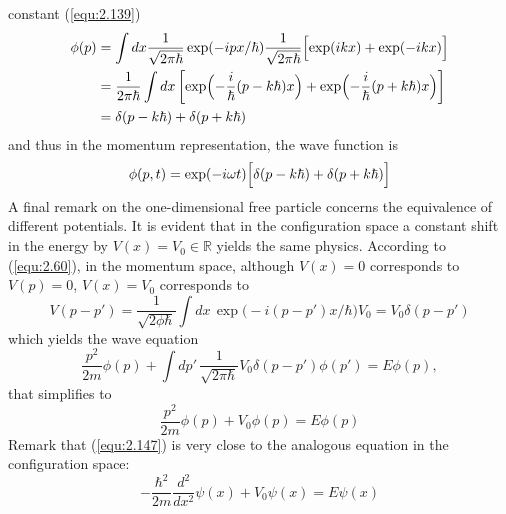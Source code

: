 constant (\ref{equ:2.139})
  \begin{alignat}{2}
    \phi(p) &= \int dx \frac{1}{\sqrt{2\pi\hbar}}
    \exp(-ipx/\hbar) \frac{1}{\sqrt{2\pi\hbar}}
    \Bigl[\exp(ikx) + \exp(-ikx)\Bigr] \\
    &=
    \frac{1}{2\pi\hbar} \int dx \,
    \biggl[
      \exp\Bigl(-\frac{i}{\hbar}(p-k\hbar)x\Bigr)+
      \exp\Bigl(-\frac{i}{\hbar}(p+k\hbar)x\Bigr)
    \biggr]\\
    &=
    \delta(p - k\hbar) + \delta(p + k\hbar)
  \end{alignat}
and thus in the momentum representation, the wave function
is
\begin{equation}
  \phi(p,t) = \exp(-i\omega t) \Bigl[\delta(p - k\hbar) +
  \delta(p+k\hbar)\Bigr]
  \label{equ:2.145}
\end{equation}
A final remark on the one-dimensional free particle concerns
the equivalence of different potentials. It is evident that
in the configuration space a constant shift in the energy by
$V(x) = V_0 \in \mathbb{R}$ yields the same physics.
According to (\ref{equ:2.60}), in the momentum space,
although $V(x) = 0$ corresponds to $V(p) = 0$, $V(x) = V_0$
corresponds to
\begin{equation}
  V(p-p') = \frac{1}{\sqrt{2\phi\hbar}}
  \int dx\,
  \exp\bigl(-i(p-p')x/\hbar\bigr) V_0 = V_0 \delta(p-p')
  \label{equ:2.146}
\end{equation}
which yields the wave equation
$$
\frac{p^2}{2m} \phi(p) + \int dp' \,
\frac{1}{\sqrt{2\pi\hbar}} V_0 \delta(p-p') \phi(p') =
E\phi(p),
$$
that simplifies to
\begin{equation}
  \frac{p^2}{2m} \phi(p) + V_0 \phi(p) = E\phi(p)
  \label{equ:2.147}
\end{equation}
Remark that (\ref{equ:2.147}) is very close to the analogous
equation in the configuration space:
\begin{equation}
  -\frac{\hbar^2}{2m} \frac{d^2}{dx^2} \psi(x) + V_0 \psi(x)
  = E \psi(x)
  \label{equ:2.148}
\end{equation}

